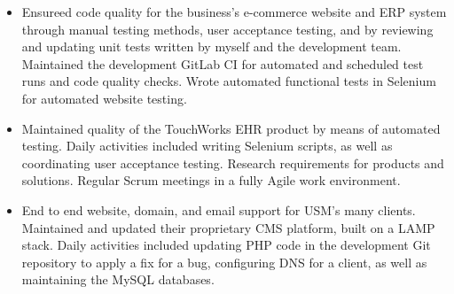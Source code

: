 \documentclass[10pt,a4paper]{altacv}
\begin{document}
\divider

\begin{itemize}
\item Ensureed code quality for the business’s e-commerce website and ERP system through
manual testing methods, user acceptance testing, and by reviewing and
updating unit tests written by myself and the development team. Maintained the development GitLab CI for automated and scheduled test runs and code quality checks. Wrote automated functional tests in Selenium for automated website testing.
\end{itemize}

\divider

\begin{itemize}
\item Maintained quality of the TouchWorks EHR product by means of automated testing.
Daily activities included writing Selenium scripts, as well as coordinating user
acceptance testing. Research requirements for products and solutions. Regular
Scrum meetings in a fully Agile work environment.
\end{itemize}

\divider

\begin{itemize}
\item End to end website, domain, and email support for USM's many clients. Maintained and
updated their proprietary CMS platform, built on a LAMP stack. Daily activities included
updating PHP code in the development Git repository to apply a fix for a bug, configuring DNS for a
client, as well as maintaining the MySQL databases.
\end{itemize}




\end{document}
